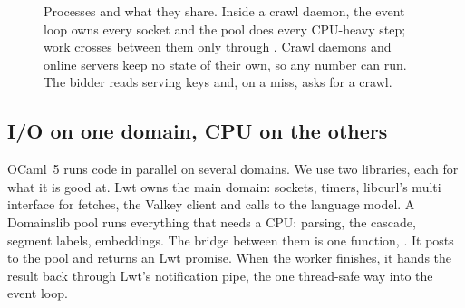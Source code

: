 \begin{figure}[t]
\caption{Processes and what they share. Inside a crawl daemon, the event loop owns every socket and the pool does every CPU-heavy step; work crosses between them only through . Crawl daemons and online servers keep no state of their own, so any number can run. The bidder reads serving keys and, on a miss, asks for a crawl.}
\label{fig:impl-layout}
\end{figure}

\subsection{I/O on one domain, CPU on the others}\label{sec:impl-concurrency}

OCaml~5 runs code in parallel on several domains. We use two libraries, each for what it is good at. Lwt owns the main domain: sockets, timers, libcurl's multi interface for fetches, the Valkey client and calls to the language model. A Domainslib pool runs everything that needs a CPU: parsing, the cascade, segment labels, embeddings. The bridge between them is one function, . It posts  to the pool and returns an Lwt promise. When the worker finishes, it hands the result back through Lwt's notification pipe, the one thread-safe way into the event loop.

